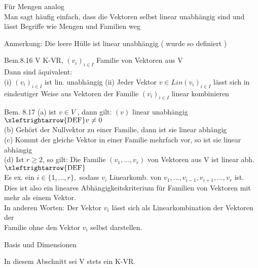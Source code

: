 \documentclass[headsepline,12pt,a4paper]{scrartcl}
\begin{document}
Für Mengen analog \\

Man sagt häufig einfach, dass die Vektoren selbst linear unabhängig sind und lässt Begriffe wie Mengen und Familien weg \\

\item Anmerkung: Die leere Hülle ist linear unabhängig ( wurde so definiert ) \\

\newpage

\item[Bem.8.16] 
V K-VR, $(v_i)_{i \in I}$ Familie von Vektoren aus V \\
Dann sind äquivalent: \\

(i) $(v_i)_{i \in I}$ ist lin. unabhängig 
(ii) Jeder Vektor $ v \in \textit{Lin}(v_i)_{i \in I}$ lässt sich in eindeutiger Weise aus Vektoren der Familie $(v_i)_{i \in I}$ linear kombinieren

\item[Bem. 8.17]
(a) ist $v \in V$ , dann gilt: $(v)$ linear unabhängig $\xleftrightarrow{\text{DEF}} v \neq 0 $ \\
(b) Gehört der Nullvektor zu einer Familie, dann ist sie linear abhängig \\
(c) Kommt der gleiche Vektor in einer Familie mehrfach vor, so ist sie linear abhängig \\
(d) Ist $r \geq 2$, so gilt: Die Familie $(v_1,...,v_r)$ von Vektoren aus V ist linear abh. $\xleftrightarrow{\text{DEF}}$ \\
Es ex. ein $i\in \{1,...,r\}, $ sodass $v_i$ Linearkomb. von $v_1,..., v_{i-1} , v_{i+1},...,v_r $ ist. \\
Dies ist also ein lineares Abhängigkeitskriterium für Familien von Vektoren mit mehr als einem Vektor. \\

In anderen Worten: Der Vektor $v_i$ lässt sich als Linearkombination der Vektoren der\\ Familie ohne den Vektor $v_i$ selbst darstellen. \\

\newpage

\begin{center}
\item[Basis und Dimensionen]
\end{center}
In diesem Abschnitt sei V stets ein K-VR.  \\
\end{document}
